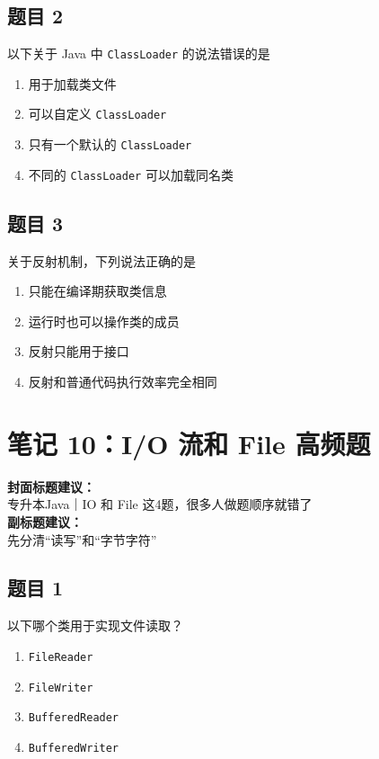 \documentclass[12pt,a4paper]{ctexart}
\begin{document}
\subsection*{题目 2}
以下关于 Java 中 \texttt{ClassLoader} 的说法错误的是
\begin{enumerate}[label=\Alph*.]
    \item 用于加载类文件
    \item 可以自定义 \texttt{ClassLoader}
    \item 只有一个默认的 \texttt{ClassLoader}
    \item 不同的 \texttt{ClassLoader} 可以加载同名类
\end{enumerate}

\subsection*{题目 3}
关于反射机制，下列说法正确的是
\begin{enumerate}[label=\Alph*.]
    \item 只能在编译期获取类信息
    \item 运行时也可以操作类的成员
    \item 反射只能用于接口
    \item 反射和普通代码执行效率完全相同
\end{enumerate}

\newpage

\section{笔记 10：I/O 流和 File 高频题}
\begin{coverbox}
\textbf{封面标题建议：}\\
专升本Java｜IO 和 File 这4题，很多人做题顺序就错了\\
\textbf{副标题建议：}\\
先分清“读写”和“字节字符”
\end{coverbox}

\subsection*{题目 1}
以下哪个类用于实现文件读取？
\begin{enumerate}[label=\Alph*.]
    \item \texttt{FileReader}
    \item \texttt{FileWriter}
    \item \texttt{BufferedReader}
    \item \texttt{BufferedWriter}
\end{enumerate}
\end{document}
